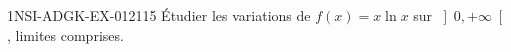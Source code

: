 \begin{exercice}{1NSI-ADGK-EX-012}{1}{15}
Étudier les variations de $f(x) = x\ln x$ sur $\left]0, +\infty\right[$, limites comprises.

\end{exercice}
